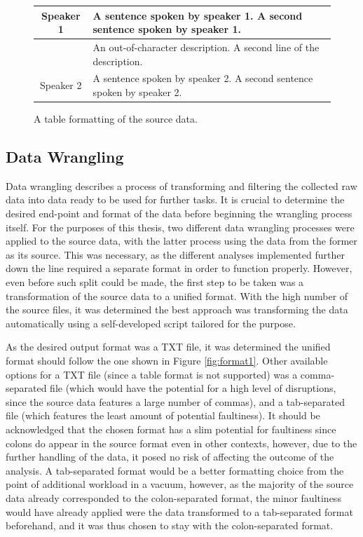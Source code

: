 \documentclass[a4paper, 11pt]{article}
\begin{document}
\begin{figure}[h!]
  \centering
  \begin{small}
  \begin{tabular}{c | l}
  Speaker 1 & A sentence spoken by speaker 1. A second sentence spoken by speaker 1. \\
  \hline
   & An out-of-character description. A second line of the description. \\
   \hline
  Speaker 2 & A sentence spoken by speaker 2. A second sentence spoken by speaker 2. \\
  \end{tabular}
  \end{small}
  \caption{A table formatting of the source data.}
  \label{fig:format2}
\end{figure}

\subsection{Data Wrangling} \label{dat:datwran}
Data wrangling describes a process of transforming and filtering the collected raw data into data ready to be used for further tasks. It is crucial to determine the desired end-point and format of the data before beginning the wrangling process itself. For the purposes of this thesis, two different data wrangling processes were applied to the source data, with the latter process using the data from the former as its source. This was necessary, as the different analyses implemented further down the line required a separate format in order to function properly. However, even before such split could be made, the first step to be taken was a transformation of the source data to a unified format. With the high number of the source files, it was determined the best approach was transforming the data automatically using a self-developed script tailored for the purpose.

As the desired output format was a TXT file, it was determined the unified format should follow the one shown in Figure \ref{fig:format1}. Other available options for a TXT file (since a table format is not supported) was a comma-separated file (which would have the potential for a high level of disruptions, since the source data features a large number of commas), and a tab-separated file (which features the least amount of potential faultiness). It should be acknowledged that the chosen format has a slim potential for faultiness since colons do appear in the source format even in other contexts, however, due to the further handling of the data, it posed no risk of affecting the outcome of the analysis. A tab-separated format would be a better formatting choice from the point of additional workload in a vacuum, however, as the majority of the source data already corresponded to the colon-separated format, the minor faultiness would have already applied were the data transformed to a tab-separated format beforehand, and it was thus chosen to stay with the colon-separated format.
\end{document}
